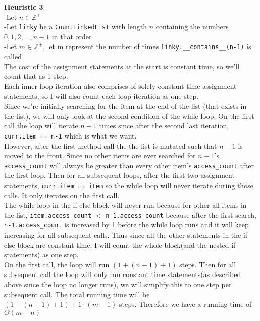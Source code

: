\documentclass[fontsize=11pt]{article}
\begin{document}
\begin{enumerate}
\begin{enumerate}
    \textbf{Heuristic 3}\\
    -Let $n \in \mathbb{Z}^+$ \\
    -Let \texttt{linky} be a \texttt{CountLinkedList} with length $n$ containing the numbers $0, 1, 2,..., n-1$ in that order \\
    -Let $m \in \mathbb{Z}^+$, let m represent the number of times \texttt{linky.\_\_contains\_\_(n-1)} is called \\

    The cost of the assignment statements at the start is constant time, so we'll count that as 1 step.\\

    Each inner loop iteration also comprises of solely constant time assignment statements, so I will also count each loop iteration as one step.\\
    Since we're initially searching for the item at the end of the list (that exists in the list), we will only look at the second condition of the while loop. On the first call the loop will iterate $n-1$ times since after the second last iteration, \texttt{curr.item == n-1} which is what we want.\\
    However, after the first method call the the list is mutated such that $n-1$ is moved to the front. Since no other items are ever searched for $n-1$'s \texttt{access\_count} will always be greater than every other item's \texttt{access\_count} after the first loop. Then for all subsequent loops, after the first two assignment statements, \texttt{curr.item == item} so the while loop will never iterate during those calls. It only iterates on the first call. \\

    The while loop in the if-else block will never run because for other all items in the list, \texttt{item.access\_count} $<$ \texttt{n-1.access\_count} because after the first search, \texttt{n-1.access\_count} is increased by 1 before the while loop runs and it will keep increasing for all subsequent calls. Thus since all the other statements in the if-else block are constant time, I will count the whole block(and the nested if statements) as one step.\\

    On the first call, the loop will run $(1+(n-1)+1)$ steps. Then for all subsequent call the loop will only run constant time statements(as described above since the loop no longer runs), we will simplify this to one step per subsequent call. The total running time will be $(1+(n-1)+1) + 1 \cdot (m-1)$ steps. Therefore we have a running time of $\Theta(m + n)$\\



\end{enumerate}
\end{enumerate}
\end{document}
